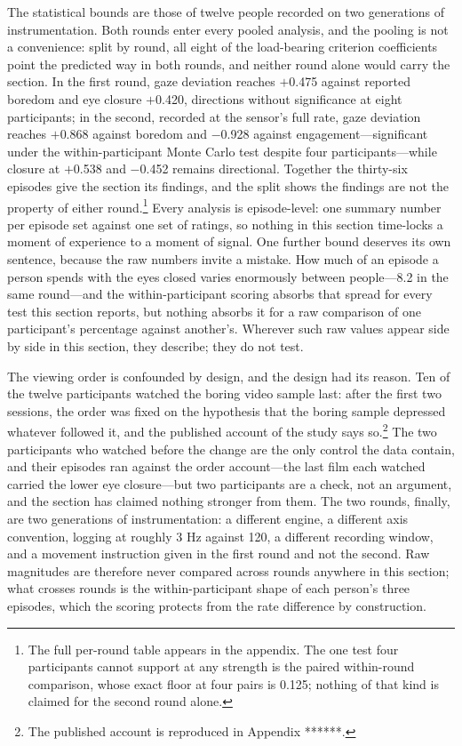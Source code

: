 The statistical bounds are those of twelve people recorded on two generations of
instrumentation. Both rounds enter every pooled analysis, and the pooling is not a
convenience: split by round, all eight of the load-bearing criterion coefficients point the
predicted way in both rounds, and neither round alone would carry the section. In the first
round, gaze deviation reaches $+$0.475 against reported boredom and eye closure $+$0.420,
directions without significance at eight participants; in the second, recorded at the
sensor's full rate, gaze deviation reaches $+$0.868 against boredom and $-$0.928 against
engagement---significant under the within-participant Monte Carlo test despite four
participants---while closure at $+$0.538 and $-$0.452 remains directional. Together the
thirty-six episodes give the section its findings, and the split shows the findings are not
the property of either round.\footnote{The full per-round table appears in the appendix. The
one test four participants cannot support at any strength is the paired within-round
comparison, whose exact floor at four pairs is 0.125; nothing of that kind is claimed for the
second round alone.} Every analysis is episode-level:
one summary number per episode set against one set of ratings, so nothing in this section
time-locks a moment of experience to a moment of signal. One further bound deserves its own
sentence, because the raw numbers invite a mistake. How much of an episode a person spends
with the eyes closed varies enormously between people---8.2%
in the same round---and the within-participant scoring absorbs that spread for every test
this section reports, but nothing absorbs it for a raw comparison of one participant's
percentage against another's. Wherever such raw values appear side by side in this section,
they describe; they do not test.

The viewing order is confounded by design, and the design had its reason. Ten of the twelve
participants watched the boring video sample last: after the first two sessions, the order
was fixed on the hypothesis that the boring sample depressed whatever followed it, and the
published account of the study says so.\footnote{The published account is reproduced in
Appendix ******.} The two participants who watched before the change are the only control
the data contain, and their episodes ran against the order account---the last film each
watched carried the lower eye closure---but two participants are a check, not an argument,
and the section has claimed nothing stronger from them. The two rounds, finally, are two
generations of instrumentation: a different engine, a different axis convention, logging at
roughly 3 Hz against 120, a different recording window, and a movement instruction given in
the first round and not the second. Raw magnitudes are therefore never compared across rounds
anywhere in this section; what crosses rounds is the within-participant shape of each
person's three episodes, which the scoring protects from the rate difference by construction.

